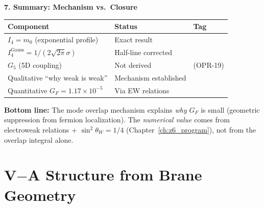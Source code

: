\begin{tcolorbox}[colback=cyan!5, colframe=cyan!50!black,
  title={Quantitative Mode Overlap: Why $G_F \sim 10^{-5}$ GeV$^{-2}$?}, breakable]
\textbf{7. Summary: Mechanism vs.\ Closure}

\begin{center}
\begin{tabular}{lll}
\toprule
\textbf{Component} & \textbf{Status} & \textbf{Tag} \\
\midrule
$I_4 = m_0$ (exponential profile) & Exact result & \tagDc{} \\
$I_4^{\text{Gauss}} = 1/(2\sqrt{2\pi}\sigma)$ & Half-line corrected & \tagM{} \\
$G_5$ (5D coupling) & Not derived & \tagP{} (OPR-19) \\
Qualitative ``why weak is weak'' & Mechanism established & \tagI{} \\
Quantitative $G_F = 1.17 \times 10^{-5}$ & Via EW relations & \tagDc{} \\
\bottomrule
\end{tabular}
\end{center}

\textbf{Bottom line:} The mode overlap mechanism explains \emph{why} $G_F$ is small
(geometric suppression from fermion localization). The \emph{numerical value} comes
from electroweak relations + $\sin^2\theta_W = 1/4$ (Chapter~\ref{ch:z6_program}), not
from the overlap integral alone.
\end{tcolorbox}

\section{V$-$A Structure from Brane Geometry}
\label{sec:ch3_va}

